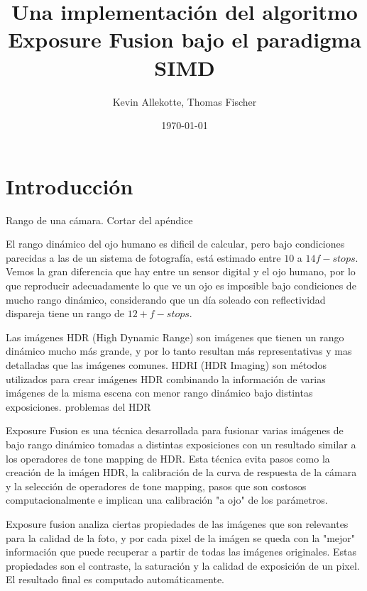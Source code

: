 \documentclass[a4paper,10pt]{article}
\title{Una implementación del algoritmo Exposure Fusion bajo el paradigma SIMD}
\author{Kevin Allekotte, Thomas Fischer}
\date{\today}
\newcommand{\attention}[1]{ {\color{red}#1} }
\begin{document}
    \maketitle

    \begin{abstract}

    \end{abstract}

    \section{Introducción}

        \attention{Rango de una cámara. Cortar del apéndice}

        El rango dinámico del ojo humano es dificil de calcular, pero bajo condiciones parecidas a las de un sistema de fotografía, está estimado entre $10$ a $14 f-stops$. Vemos la gran diferencia que hay entre un sensor digital y el ojo humano, por lo que reproducir adecuadamente lo que ve un ojo es imposible bajo condiciones de mucho rango dinámico, considerando que un día soleado con reflectividad dispareja tiene un rango de $12+ f-stops$.

        Las imágenes HDR (High Dynamic Range) son imágenes que tienen un rango dinámico mucho más grande, y por lo tanto resultan más representativas y mas detalladas que las imágenes comunes. HDRI (HDR Imaging) son métodos utilizados para crear imágenes HDR combinando la información de varias imágenes de la misma escena con menor rango dinámico bajo distintas exposiciones. \attention{problemas del HDR}

        Exposure Fusion \cite{DBLP:conf/pg/MertensKR07} es una técnica desarrollada para fusionar varias imágenes de bajo rango dinámico tomadas a distintas exposiciones  con un resultado similar a los operadores de tone mapping de HDR. Esta técnica evita pasos como la creación de la imágen HDR, la calibración de la curva de respuesta de la cámara y la selección de operadores de tone mapping, pasos que son costosos computacionalmente e implican una calibración "a ojo" de los parámetros.
        
        Exposure fusion analiza ciertas propiedades de las imágenes que son relevantes para la calidad de la foto, y por cada pixel de la imágen se queda con la "mejor" información que puede recuperar a partir de todas las imágenes originales. Estas propiedades son el contraste, la saturación y la calidad de exposición de un pixel. El resultado final es computado automáticamente.
\end{document}
